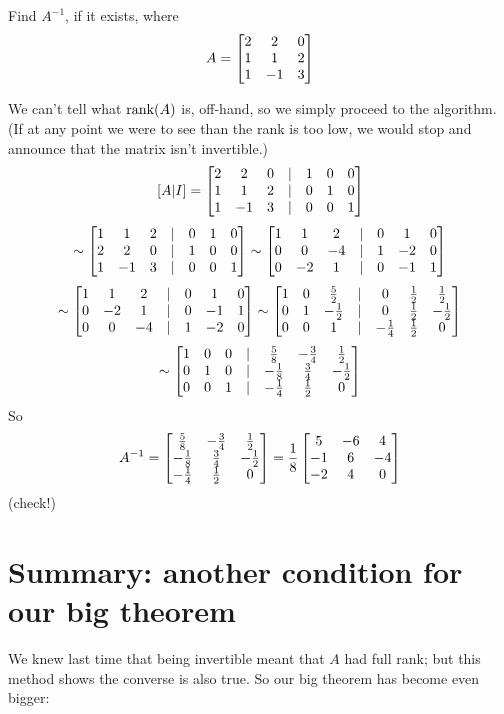 \begin{myprob} Find $A^{-1}$, if it exists, where 
$$
A = \left[ \begin{matrix} 2 & 2 & 0 \\ 1 & 1 & 2\\ 1 & -1 & 3 \end{matrix} \right]
$$

\begin{mysol}  We can't tell what $\textrm{rank}(A)$ is, off-hand, so we simply proceed
to the algorithm.  (If at any point we were to see than the rank is too low,
we would stop and announce that the matrix isn't invertible.)
$$
[A|I] = \left[ \begin{matrix} 
2 & 2 & 0 &|& 1 & 0 & 0\\ 
1 & 1 & 2 &|& 0 & 1 & 0\\ 
1 & -1 & 3&|& 0 & 0 & 1 \end{matrix} \right]
$$
$$
\sim \left[ \begin{matrix} 
1 & 1 & 2 &|& 0 & 1 & 0\\ 
2 & 2 & 0 &|& 1 & 0 & 0\\ 
1 & -1 & 3&|& 0 & 0 & 1 \end{matrix} \right]
\sim
\left[ \begin{matrix} 
1 & 1 & 2 &|& 0 & 1 & 0\\ 
0 & 0 & -4 &|& 1 & -2 & 0\\ 
0 & -2 & 1&|& 0 & -1 & 1 \end{matrix} \right]
$$
$$
\sim \left[ \begin{matrix} 
1 & 1 & 2 &|& 0 & 1 & 0\\ 
0 & -2 & 1&|& 0 & -1 & 1\\
0 & 0 & -4 &|& 1 & -2 & 0 \end{matrix} \right]
\sim \left[ \begin{matrix} 
1 & 0 & \frac52 &|& 0 & \frac12 & \frac12\\ 
0 & 1 & -\frac12 &|& 0 & \frac12 & -\frac12\\
0 & 0 & 1 &|& -\frac14 & \frac12 & 0 \end{matrix} \right]
$$
$$
\sim \left[ \begin{matrix} 
1 & 0 & 0 &|& \frac58 & -\frac34 & \frac12\\ 
0 & 1 & 0 &|& -\frac18 & \frac34 & -\frac12\\
0 & 0 & 1 &|& -\frac14 & \frac12 & 0 \end{matrix} \right]
$$
So 
$$
A^{-1} = \left[ \begin{matrix} 
  \frac58 & -\frac34 & \frac12\\ 
 -\frac18 & \frac34 & -\frac12\\
 -\frac14 & \frac12 & 0 \end{matrix} \right] = 
\frac18\left[ \begin{matrix} 
5 & -6 & 4\\ 
-1 & 6 & -4\\ 
-2 & 4 & 0 \end{matrix} \right]
$$
(check!)
\end{mysol}\end{myprob}

\section{Summary:  another condition for our big theorem}

We knew last time that being invertible meant that $A$ had full
rank; but this method shows the converse is also true.  So 
our big theorem has become even bigger:

